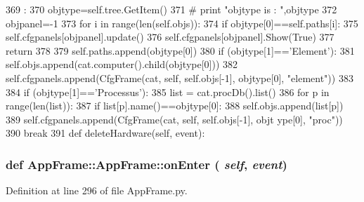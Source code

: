 \begin{DoxyCode}
369                            :
370         objtype=self.tree.GetItem()
371 #        print "objtype is : ",objtype
372         objpanel=-1
373         for i in range(len(self.objs)):
374             if objtype[0]==self.paths[i]:
375                 self.cfgpanels[objpanel].update()
376                 self.cfgpanels[objpanel].Show(True)
377                 return
378             
379         self.paths.append(objtype[0])
380         if (objtype[1]=='Element'):
381             self.objs.append(cat.computer().child(objtype[0]))
382             self.cfgpanels.append(CfgFrame(cat, self, self.objs[-1], objtype[0], 
      "element"))
383 
384         if (objtype[1]=='Processus'):
385             list = cat.procDb().list()
386             for p in range(len(list)):
387                 if list[p].name()==objtype[0]:
388                     self.objs.append(list[p])
389                     self.cfgpanels.append(CfgFrame(cat, self, self.objs[-1], objt
      ype[0], "proc"))
390                     break
391                 
    def deleteHardware(self, event):
\end{DoxyCode}
\hypertarget{classAppFrame_1_1AppFrame_a40b3826412cf97464898e448b5eb9b00}{
\subsubsection[{onEnter}]{\setlength{\rightskip}{0pt plus 5cm}def AppFrame::AppFrame::onEnter ( {\em self}, \/   {\em event})}}
\label{classAppFrame_1_1AppFrame_a40b3826412cf97464898e448b5eb9b00}


Definition at line 296 of file AppFrame.py.


